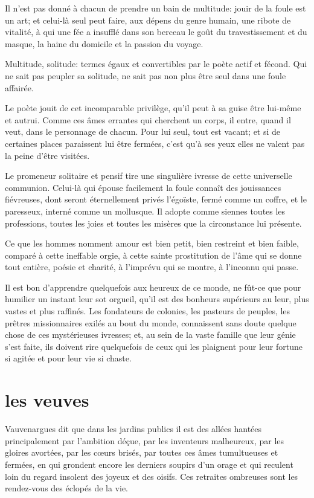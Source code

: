 Il n’est pas donné à chacun de prendre un bain de
multitude: jouir de la foule est un art; et celui{}-là seul peut faire,
aux dépens du genre humain, une ribote de vitalité, à qui une fée a
insufflé dans son berceau le goût du travestissement et du masque, la
haine du domicile et la passion du voyage.

Multitude, solitude: termes égaux et convertibles par le poète actif et
fécond. Qui ne sait pas peupler sa solitude, ne sait pas non plus être
seul dans une foule affairée.

Le poète jouit de cet incomparable privilège, qu’il
peut à sa guise être lui{}-même et autrui. Comme ces âmes errantes qui
cherchent un corps, il entre, quand il veut, dans le personnage de
chacun. Pour lui seul, tout est vacant; et si de certaines places
paraissent lui être fermées, c’est
qu’à ses yeux elles ne valent pas la peine
d’être visitées.

Le promeneur solitaire et pensif tire une singulière ivresse de cette
universelle communion. Celui{}-là qui épouse facilement la foule
connaît des jouissances fiévreuses, dont seront éternellement privés
l’égoïste, fermé comme un coffre, et le paresseux,
interné comme un mollusque. Il adopte comme siennes toutes les
professions, toutes les joies et toutes les misères que la circonstance
lui présente.

Ce que les hommes nomment amour est bien petit, bien restreint et bien
faible, comparé à cette ineffable orgie, à cette sainte prostitution de
l’âme qui se donne tout entière, poésie et charité, à
l’imprévu qui se montre, à l’inconnu
qui passe.

\quebra
Il est bon d’apprendre quelquefois aux heureux de ce
monde, ne fût{}-ce que pour humilier un instant leur sot orgueil,
qu’il est des bonheurs supérieurs au leur, plus vastes
et plus raffinés. Les fondateurs de colonies, les pasteurs de peuples,
les prêtres missionnaires exilés au bout du monde, connaissent sans
doute quelque chose de ces mystérieuses ivresses; et, au sein de la
vaste famille que leur génie s’est faite, ils doivent
rire quelquefois de ceux qui les plaignent pour leur fortune si agitée
et pour leur vie si chaste.

\quebra\section[Les veuves]{les veuves}

Vauvenargues dit que dans les jardins publics il est des allées hantées
principalement par l’ambition déçue, par les
inventeurs malheureux, par les gloires avortées, par les c\oe urs brisés,
par toutes ces âmes tumultueuses et fermées, en qui grondent encore les
derniers soupirs d’un orage et qui reculent loin du
regard insolent des joyeux et des oisifs. Ces retraites ombreuses sont
les rendez{}-vous des éclopés de la vie.

